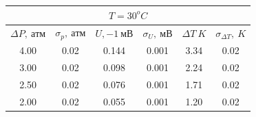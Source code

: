 \documentclass[12pt,a4paper]{article}
\begin{document}
\begin{enumerate}
    \begin{table}[htp]
        \centering
        \begin{tabular}[htp]{|c|c|c|c|c|c|}
            \hline
            \multicolumn{6}{|c|}{$T=30^oC$}\\
            \hline
            $\Delta P,\ атм$&$\sigma_p,\ атм$&$U,-1\ мВ$&$\sigma_U,\ мВ$&$\Delta T\ K$&$\sigma_{\Delta T},\ K$\\
            \hline
            4.00&0.02&0.144&0.001&3.34&0.02\\
            \hline
            3.00&0.02&0.098&0.001&2.24&0.02\\
            \hline
            2.50&0.02&0.076&0.001&1.71&0.02\\
            \hline
            2.00&0.02&0.055&0.001&1.20&0.02\\
            \hline
        \end{tabular}
    \end{table}


\end{enumerate}
\end{document}
